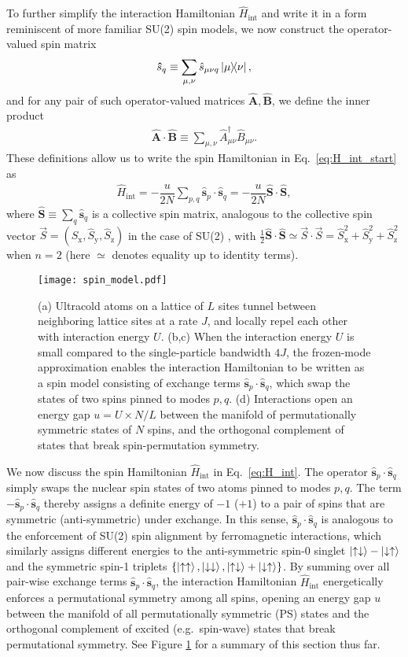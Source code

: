 \documentclass[aps,pra,nofootinbib,twocolumn,superscriptaddress]{revtex4-2}
\renewcommand{\t}{\text} %
\newcommand{\f}[2]{\dfrac{#1}{#2}} %
\renewcommand{\set}[1]{\left\{#1\right\}} %
\renewcommand{\v}{\bm} %
\newcommand{\1}{\mathds{1}}
\newcommand{\s}{\hat s}
\renewcommand{\H}{\hat H}
\renewcommand{\S}{\hat S}
\newcommand{\up}{\uparrow}
\newcommand{\dn}{\downarrow}
\newcommand{\x}{\text{x}}
\newcommand{\y}{\text{y}}
\newcommand{\z}{\text{z}}
\begin{document}
To further simplify the interaction Hamiltonian $\H_{\t{int}}$ and write it in a form reminiscent of more familiar SU(2) spin models, we now construct the operator-valued spin matrix
\begin{align}
  \v\s_q \equiv \sum_{\mu,\nu} \s_{\mu\nu q} \op{\mu}{\nu},
\end{align}
and for any pair of such operator-valued matrices $\v{\hat{A}},\v{\hat{B}}$, we define the inner product
\begin{align}
  \v{\hat{A}} \cdot \v{\hat{B}}
  \equiv \sum_{\mu,\nu} \hat A_{\mu\nu}^\dag \hat B_{\mu\nu}.
  \label{eq:dot_product}
\end{align}
These definitions allow us to write the spin Hamiltonian in Eq.~\eqref{eq:H_int_start} as
\begin{align}
  \H_{\t{int}} = -\f{u}{2N} \sum_{p,q} \v\s_p\cdot\v\s_q
  = -\f{u}{2N}\v\S\cdot\v\S,
  \label{eq:H_int}
\end{align}
where $\v\S\equiv\sum_q\v\s_q$ is a collective spin matrix, analogous to the collective spin vector $\vec S=(\S_\x,\S_\y,\S_\z)$ in the case of SU(2) \cite{he2019engineering}, with $\frac12\v\S\cdot\v\S \simeq \vec S\cdot\vec S = \S_\x^2 + \S_\y^2 + \S_\z^2$ when $n=2$ (here $\simeq$ denotes equality up to identity terms).

\begin{figure}
\centering
\texttt{[image: spin\_model.pdf]}
\caption{
(a) Ultracold atoms on a lattice of $L$ sites tunnel between neighboring lattice sites at a rate $J$, and locally repel each other with interaction energy $U$.
(b,c) When the interaction energy $U$ is small compared to the single-particle bandwidth $4J$, the frozen-mode approximation enables the interaction Hamiltonian to be written as a spin model consisting of exchange terms $\v\s_p\cdot\v\s_q$, which swap the states of two spins pinned to modes $p,q$.
(d) Interactions open an energy gap $u=U\times N/L$ between the manifold of permutationally symmetric states of $N$ spins, and the orthogonal complement of states that break spin-permutation symmetry.
}
\label{fig:spin_model}
\end{figure}

We now discuss the spin Hamiltonian $\H_{\t{int}}$ in Eq.~\eqref{eq:H_int}.
The operator $\v\s_p\cdot\v\s_q$ simply swaps the nuclear spin states of two atoms pinned to modes $p,q$.
The term $-\v\s_p\cdot\v\s_q$ thereby assigns a definite energy of $-1$ ($+1$) to a pair of spins that are symmetric (anti-symmetric) under exchange.
In this sense, $\v\s_p\cdot\v\s_q$ is analogous to the enforcement of SU(2) spin alignment by ferromagnetic interactions, which similarly assigns different energies to the anti-symmetric spin-0 singlet $\ket{\up\dn}-\ket{\dn\up}$ and the symmetric spin-1 triplets $\set{\ket{\up\up},\ket{\dn\dn},\ket{\up\dn}+\ket{\dn\up}}$.
By summing over all pair-wise exchange terms $\v\s_p\cdot\v\s_q$, the interaction Hamiltonian $\H_{\t{int}}$ energetically enforces a permutational symmetry among all spins, opening an energy gap $u$ between the manifold of all permutationally symmetric (PS) states and the orthogonal complement of excited (e.g.~spin-wave) states that break permutational symmetry.
See Figure \ref{fig:spin_model} for a summary of this section thus far.
\end{document}
